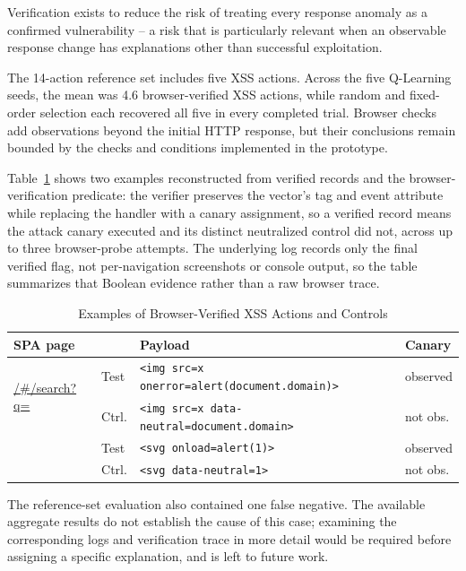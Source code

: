 \documentclass[conference, a4paper]{IEEEtran}
\begin{document}
Verification exists to reduce the risk of treating every response
anomaly as a confirmed vulnerability -- a risk that is particularly
relevant when an observable response change has explanations other
than successful exploitation.

The 14-action reference set includes five XSS actions. Across the
five Q-Learning seeds, the mean was 4.6 browser-verified XSS
actions, while random and fixed-order selection each recovered all
five in every completed trial. Browser checks add observations
beyond the initial HTTP response, but their conclusions remain
bounded by the checks and conditions implemented in the prototype.

Table~\ref{tab:xss-traces} shows two examples reconstructed from
verified records and the browser-verification predicate: the
verifier preserves the vector's tag and event attribute while
replacing the handler with a canary assignment, so a verified record
means the attack canary executed and its distinct neutralized
control did not, across up to three browser-probe attempts. The
underlying log records only the final verified flag, not
per-navigation screenshots or console output, so the table
summarizes that Boolean evidence rather than a raw browser trace.

\begin{table}[!t]
\caption{Examples of Browser-Verified XSS Actions and Controls}
\label{tab:xss-traces}
\centering
\scriptsize
\setlength{\tabcolsep}{2.5pt}
\begin{tabular}{p{} l p{} p{}}
\toprule
\textbf{SPA page} & & \textbf{Payload} & \textbf{Canary}\\
\midrule
\multirow{2}{0.16\columnwidth}{\url{/#/search?q=}}
 & Test & \lstinline|<img src=x onerror=alert(document.domain)>| & observed\\
 & Ctrl. & \lstinline|<img src=x data-neutral=document.domain>| & not obs.\\
\addlinespace
\multirow{2}{0.16\columnwidth}{\url{/#/track-result?id=}}
 & Test & \lstinline|<svg onload=alert(1)>| & observed\\
 & Ctrl. & \lstinline|<svg data-neutral=1>| & not obs.\\
\bottomrule
\end{tabular}
\end{table}
\setlength{\tabcolsep}{6pt}

The reference-set evaluation also contained one false negative.
The available aggregate results do not establish the cause of this
case; examining the corresponding logs and verification trace in
more detail would be required before assigning a specific
explanation, and is left to future work.
\end{document}
